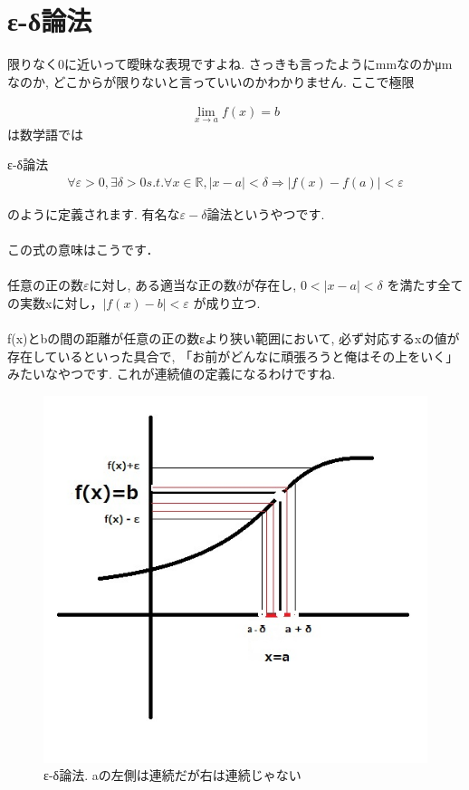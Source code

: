 \documentclass[11pt,a4paper,uplatex]{ujreport}
\begin{document}
\section{ε-δ論法 \label{ed}}
限りなく0に近いって曖昧な表現ですよね. さっきも言ったようにmmなのかμmなのか, どこからが限りないと言っていいのかわかりません. ここで極限


\begin{eqnarray}
\lim_{x\to a} f(x) = b
\end{eqnarray}
は数学語では


\begin{screen}
ε-δ論法
\begin{eqnarray}
\forall \varepsilon >0, \exists \delta>0  s.t.  \forall x \in \mathbb{R}, |x-a|<\delta \Rightarrow |f(x)-f(a)|<\varepsilon
\label{eq:ed}
\end{eqnarray}
\end{screen}

のように定義されます. 有名な$\varepsilon - \delta $論法というやつです.\\
\\
この式の意味はこうです．\\
\\
任意の正の数$\varepsilon $に対し, ある適当な正の数$\delta$が存在し, $0<|x-a|<\delta$ を満たす全ての実数xに対し，$|f(x)-b|<\varepsilon$ が成り立つ.\\
\\
f(x)とbの間の距離が任意の正の数εより狭い範囲において, 必ず対応するxの値が存在しているといった具合で, 「お前がどんなに頑張ろうと俺はその上をいく」みたいなやつです. これが連続値の定義になるわけですね.

\begin{figure}[H]
\label{im:ed}
  \centering
  \includegraphics[width=120mm,bb=0 0 510 487]{../figures/ed.jpg}
  \caption{ε-δ論法. aの左側は連続だが右は連続じゃない}
\end{figure}
\end{document}
